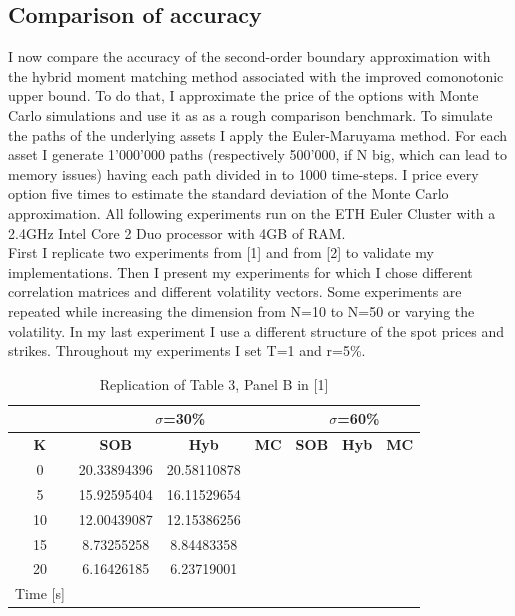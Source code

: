 \documentclass[a4paper]{article}
\begin{document}
\subsection{Comparison of accuracy}
\label{sec:accuracy}
I now compare the accuracy of the second-order boundary approximation with the hybrid moment matching method associated with the improved comonotonic upper bound. To do that, I approximate the price of the options with Monte Carlo simulations and use it as as a rough comparison benchmark. To simulate the paths of the underlying assets I apply the Euler-Maruyama method. For each asset I generate 1'000'000 paths (respectively 500'000, if N big, which can lead to memory issues) having each path divided in to 1000 time-steps. I price every option five times to estimate the standard deviation of the Monte Carlo approximation. All following experiments run on the ETH Euler Cluster with a 2.4GHz Intel Core 2 Duo processor with 4GB of RAM. \\
First I replicate two experiments from [1] and from [2] to validate my implementations. Then I present my experiments for which I chose different correlation matrices and different volatility vectors. Some experiments are repeated while increasing the dimension from N=10 to N=50 or varying the volatility. In my last experiment I use a different structure of the spot prices and strikes. Throughout my experiments I set T=1 and r=5\%.
\captionsetup{skip=0pt}
\begin {table}
\caption {Replication of Table 3, Panel B in [1]} 
\begin{center}
\begin{tabular}{c|c c c|c c c}
\hline
\multicolumn{1}{c|}{} & \multicolumn{3}{|c|}{$\sigma$=30\%} & \multicolumn{3}{|c}{$\sigma$=60\%} \\ 
\hline
  \textbf{K} & \textbf{SOB} & \textbf{Hyb}	& \textbf{MC} & \textbf{SOB} & \textbf{Hyb} & \textbf{MC} \\
  0 &	20.33894396 & 20.58110878 &  & & &  \\
  5 & 15.92595404 & 16.11529654 & & &  &  \\
10 & 12.00439087 & 12.15386256 &  &  &  &  \\
15 & 8.73255258 & 8.84483358 &  &  &  &  \\
20 & 6.16426185 & 6.23719001 &  &  &  &  \\
\hline
Time [s] & & & & & & \\
\hline
\end{tabular}
\end{center}
\end{table}
\end{document}
